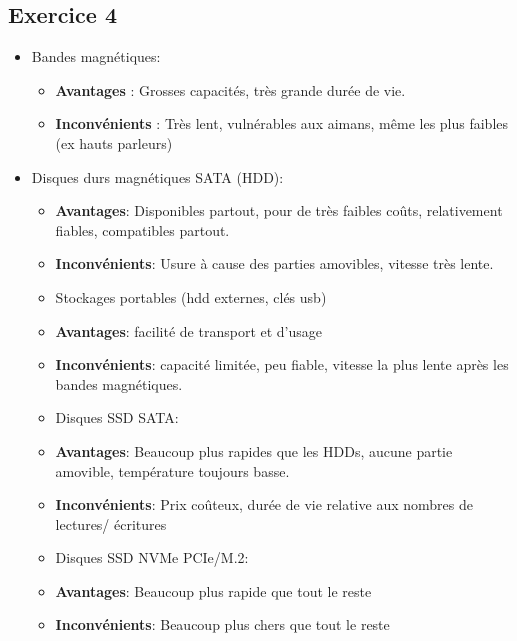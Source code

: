 \documentclass{report}
\begin{document}
\subsection{Exercice 4}
\begin{itemize}
  \item Bandes magnétiques:
    \begin{itemize}
      \item \textbf{Avantages} : Grosses capacités, très grande durée de vie.
      \item \textbf{Inconvénients} : Très lent, vulnérables aux aimans, même les plus faibles (ex
      hauts parleurs)
    \end{itemize}
  \item Disques durs magnétiques SATA (HDD):
    \begin{itemize}
      \item \textbf{Avantages}: Disponibles partout, pour de très faibles coûts, relativement fiables,
        compatibles partout.
      \item \textbf{Inconvénients}: Usure à cause des parties amovibles, vitesse très lente.
    \end{itemize}
    \begin{itemize}
  \item Stockages portables (hdd externes, clés usb)
      \item \textbf{Avantages}: facilité de transport et d'usage
      \item \textbf{Inconvénients}: capacité limitée, peu fiable, vitesse la plus lente après les
      bandes magnétiques.
    \end{itemize}
    \begin{itemize}
  \item Disques SSD SATA:
      \item \textbf{Avantages}: Beaucoup plus rapides que les HDDs, aucune partie amovible,
        température toujours basse.
      \item \textbf{Inconvénients}: Prix coûteux, durée de vie relative aux nombres de lectures/
      écritures
    \end{itemize}
    \begin{itemize}
  \item Disques SSD NVMe PCIe/M.2:
      \item \textbf{Avantages}: Beaucoup plus rapide que tout le reste
      \item \textbf{Inconvénients}: Beaucoup plus chers que tout le reste
    \end{itemize}
\end{itemize}
\end{document}
